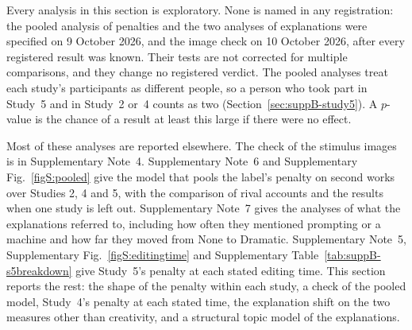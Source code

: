 \label{sec:suppB-crossstudy}

Every analysis in this section is exploratory. None is named in any registration: the pooled analysis of penalties and the two analyses of explanations were specified on 9 October 2026, and the image check on 10 October 2026, after every registered result was known. Their tests are not corrected for multiple comparisons, and they change no registered verdict. The pooled analyses treat each study's participants as different people, so a person who took part in Study~5 and in Study~2 or~4 counts as two (Section~\ref{sec:suppB-study5}). A $p$-value is the chance of a result at least this large if there were no effect.

Most of these analyses are reported elsewhere. The check of the stimulus images is in Supplementary Note~4. Supplementary Note~6 and Supplementary Fig.~\ref{figS:pooled} give the model that pools the label's penalty on second works over Studies 2, 4 and 5, with the comparison of rival accounts and the results when one study is left out. Supplementary Note~7 gives the analyses of what the explanations referred to, including how often they mentioned prompting or a machine and how far they moved from None to Dramatic. Supplementary Note~5, Supplementary Fig.~\ref{figS:editingtime} and Supplementary Table~\ref{tab:suppB-s5breakdown} give Study~5's penalty at each stated editing time. This section reports the rest: the shape of the penalty within each study, a check of the pooled model, Study~4's penalty at each stated time, the explanation shift on the two measures other than creativity, and a structural topic model of the explanations.

